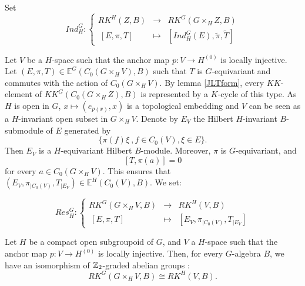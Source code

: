Set
\[Ind_H^G :
\left\{\begin{array}{rcl} 
RK^H(Z,B) & \rightarrow & RK^G(G\times_H Z,B) \\
\ [E,\pi,T ] & \mapsto & [ Ind_H^G (E), \tilde \pi, \tilde T ] \end{array} \right.\]

Let $V$ be a $H$-space such that the anchor map $p : V\rightarrow H^{(0)}$ is locally injective. Let $(E,\pi,T)\in \mathbb E^G(C_0(G\times_H V),B)$ such that $T$ is $G$-equivariant and commutes with the action of $C_0(G\times_H V)$. By lemma \ref{JLTform}, every $KK$-element of $KK^G(C_0(G\times_H Z),B)$ is represented by a $K$-cycle of this type.  As $H$ is open in $G$, $x\mapsto (e_{p(x)},x)$ is a topological embedding and $V$ can be seen as a $H$-invariant open subset in $G\times_H V$. Denote by $E_V$ the Hilbert $H$-invariant $B$-submodule of $E$ generated by 
\[\{\pi(f)\xi \ ,f\in C_0(V), \xi\in E\}.\]
Then $E_{V}$ is a $H$-equivariant Hilbert $B$-module. Moreover, $\pi$ is $G$-equivariant, and \[[T,\pi(a)]=0\] for every $a\in C_0(G\times_H V)$. This ensures that $(E_V,\pi_{|C_0(V)}, T_{|E_V}) \in \mathbb E^H(C_0(V),B)$. We set:

\[Res_H^G :
\left\{\begin{array}{rcl} 
 RK^G(G\times_H V,B) & \rightarrow & RK^H(V,B) \\
\ [E,\pi,T ] & \mapsto & [ E_V,\pi_{|C_0(V)}, T_{|E_V} ] \end{array} \right.\]

\begin{lem} \label{Restriction} Let $H$ be a compact open subgroupoid of $G$, and $V$ a $H$-space such that the anchor map $p : V\rightarrow H^{(0)}$ is locally injective. Then, for every $G$-algebra $B$, we have an isomorphism of $\mathbb Z_2$-graded abelian groups :
\[RK^G( G\times_H V, B) \cong RK^H(V, B).\]
\end{lem}

